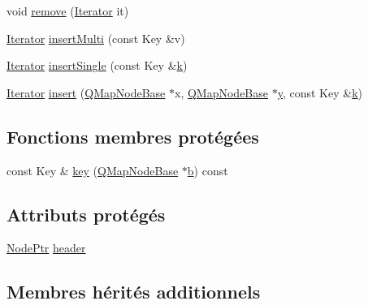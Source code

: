 \begin{DoxyCompactItemize}
\item 
void \hyperlink{class_q_map_private_a7f2f689ac684d8577f79e12cab91dbd4}{remove} (\hyperlink{class_q_map_private_a5326545ba578532909650c2f4a8d4d34}{Iterator} it)
\item 
\hyperlink{class_q_map_private_a5326545ba578532909650c2f4a8d4d34}{Iterator} \hyperlink{class_q_map_private_a5d4b166c2058946aec5335ca777b7949}{insert\+Multi} (const Key \&v)
\item 
\hyperlink{class_q_map_private_a5326545ba578532909650c2f4a8d4d34}{Iterator} \hyperlink{class_q_map_private_a241ba6529b73bda8e8293227837bae76}{insert\+Single} (const Key \&\hyperlink{060__command__switch_8tcl_a20363f854eb4098a446733d63d34dbc1}{k})
\item 
\hyperlink{class_q_map_private_a5326545ba578532909650c2f4a8d4d34}{Iterator} \hyperlink{class_q_map_private_a5cc8d79a81cca31f59d697a120d7319d}{insert} (\hyperlink{struct_q_map_node_base}{Q\+Map\+Node\+Base} $\ast$x, \hyperlink{struct_q_map_node_base}{Q\+Map\+Node\+Base} $\ast$\hyperlink{058__bracket__recursion_8tcl_a2fb1c5cf58867b5bbc9a1b145a86f3a0}{y}, const Key \&\hyperlink{060__command__switch_8tcl_a20363f854eb4098a446733d63d34dbc1}{k})
\end{DoxyCompactItemize}
\subsection*{Fonctions membres protégées}
\begin{DoxyCompactItemize}
\item 
const Key \& \hyperlink{class_q_map_private_a6369be6e42af51852f85851ffca6a42c}{key} (\hyperlink{struct_q_map_node_base}{Q\+Map\+Node\+Base} $\ast$\hyperlink{060__command__switch_8tcl_a68bdb74c144118d936931c46f75d4b3e}{b}) const 
\end{DoxyCompactItemize}
\subsection*{Attributs protégés}
\begin{DoxyCompactItemize}
\item 
\hyperlink{class_q_map_private_a6b529a90a461f2d2df3e1b2356250fb4}{Node\+Ptr} \hyperlink{class_q_map_private_a68a9e07ff34146b090cbac239851139e}{header}
\end{DoxyCompactItemize}
\subsection*{Membres hérités additionnels}


